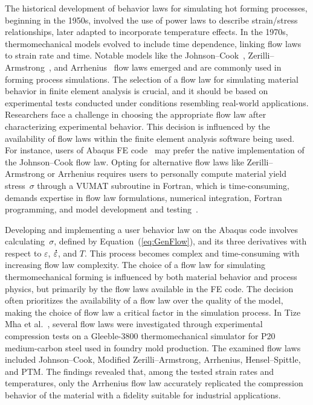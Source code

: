 \documentclass[algorithms,article,accept,pdftex,oneauthor]{Definitions/mdpi}
\DeclareRobustCommand{\mdot}[1]{\accentset{\mbox{\bfseries .}}{#1}}
\begin{document}
The historical development of behavior laws for simulating hot forming processes, beginning in the 1950s, involved the use of power laws to describe strain/stress relationships, later adapted to incorporate temperature effects.
In the 1970s, thermomechanical models evolved to include time dependence, linking flow laws to strain rate and time.
Notable models like the Johnson--Cook~\cite{Johnson-1983-CMD}, Zerilli--Armstrong~\cite{Zerilli-1987-DMB}, and Arrhenius~\cite{Jonas-1969} flow laws emerged and are commonly used in forming process simulations.
The selection of a flow law for simulating material behavior in finite element analysis is crucial, and it should be based on experimental tests conducted under conditions resembling real-world applications.
Researchers face a challenge in choosing the appropriate flow law after characterizing experimental behavior.
This decision is influenced by the availability of flow laws within the finite element analysis software being used.
For instance, users of Abaqus FE code~\cite{Abaqus} may prefer the native implementation of the Johnson--Cook flow law.
Opting for alternative flow laws like Zerilli--Armstrong or Arrhenius requires users to personally compute material yield stress~$\sigma$ through a VUMAT subroutine in Fortran, which is time-consuming, demands expertise in flow law formulations, numerical integration, Fortran programming, and model development and testing~\cite{Gao-2007-FRT, Ming-2018-ERV, Liang-2022}.

Developing and implementing a user behavior law on the Abaqus code involves calculating~$\sigma$, defined by Equation~(\ref{eq:GenFlow}), and its three derivatives with respect to $\varepsilon$, $\mdot{\varepsilon}$, and $T$.
This process becomes complex and time-consuming with increasing flow law complexity.
The choice of a flow law for simulating thermomechanical forming is influenced by both material behavior and process physics, but primarily by the flow laws available in the FE code.
The decision often prioritizes the availability of a flow law over the quality of the model, making the choice of flow law a critical factor in the simulation process.
In Tize Mha et al.~\cite{Tize-2023-IEP}, several flow laws were investigated through experimental compression tests on a Gleeble-3800 thermomechanical simulator for P20 medium-carbon steel used in foundry mold production.
The examined flow laws included Johnson--Cook, Modified Zerilli--Armstrong, Arrhenius, Hensel--Spittle, and PTM.
The findings revealed that, among the tested strain rates and temperatures, only the Arrhenius flow law accurately replicated the compression behavior of the material with a fidelity suitable for industrial applications.
\end{document}
